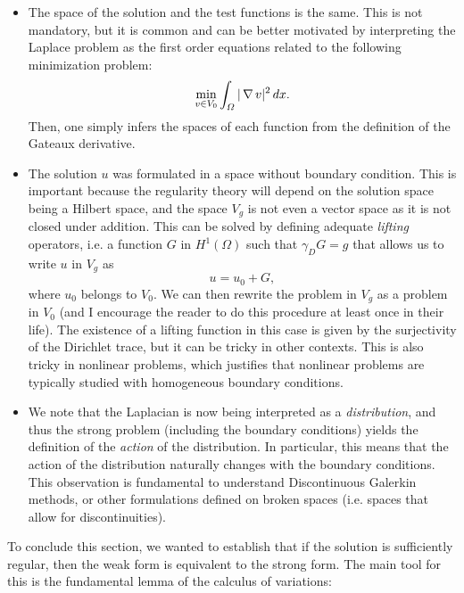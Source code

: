 \begin{itemize}
    \item The space of the solution and the test functions is the same. This is not mandatory, but it is common and can be better motivated by interpreting the Laplace problem as the first order equations related to the following minimization problem: 
    \begin{equation*}
        \min_{v \in V_0} \int_\Omega |\operatorname{\nabla} v|^2\,dx .
    \end{equation*}
    Then, one simply infers the spaces of each function from the definition of the Gateaux derivative. 
    \item The solution $u$ was formulated in a space without boundary condition. This is important because the regularity theory will depend on the solution space being a Hilbert space, and the space $V_g$ is not even a vector space as it is not closed under addition. This can be solved by defining adequate \emph{lifting} operators, i.e. a function $G$ in $H^1(\Omega)$ such that $\gamma_D G = g$ that allows us to write $u$ in $V_g$ as 
    \begin{equation*}
        u = u_0 + G,
    \end{equation*}
    where $u_0$ belongs to $V_0$. We can then rewrite the problem in $V_g$ as a problem in $V_0$ (and I encourage the reader to do this procedure at least once in their life). The existence of a lifting function in this case is given by the surjectivity of the Dirichlet trace, but it can be tricky in other contexts. This is also tricky in nonlinear problems, which justifies that nonlinear problems are typically studied with homogeneous boundary conditions.  
    \item We note that the Laplacian is now being interpreted as a \emph{distribution}, and thus the strong problem (including the boundary conditions) yields the definition of the \emph{action} of the distribution. In particular, this means that the action of the distribution naturally changes with the boundary conditions. This observation is fundamental to understand Discontinuous Galerkin methods, or other formulations defined on broken spaces (i.e. spaces that allow for discontinuities). 
\end{itemize}

To conclude this section, we wanted to establish that if the solution is sufficiently regular, then the weak form is equivalent to the strong form. The main tool for this is the fundamental lemma of the calculus of variations: 

